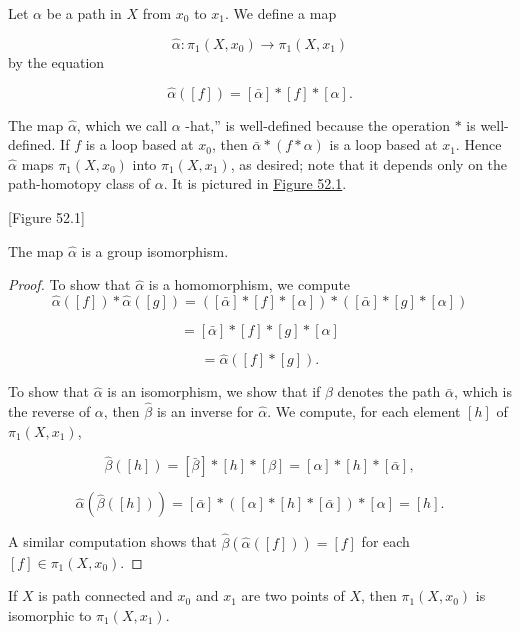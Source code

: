 \begin{definition}
Let \(\alpha\) be a path in \(X\) from \(x_{0}\) to \(x_{1}\). We define a map

\[
\hat{\alpha } : {\pi }_{1}( {X,x_{0}}) \rightarrow {\pi }_{1}( {X,x_{1}})
\]
by the equation

\[
\hat{\alpha }( [ f] ) = [ \bar{\alpha }] * [ f] * [ \alpha ] .
\]

The map \(\hat{\alpha }\), which we call \(\alpha\) -hat,'' is well-defined because the operation \(*\) is well-defined. If \(f\) is a loop based at \(x_{0}\), then \(\bar{\alpha } * ( {f * \alpha })\) is a loop based at \(x_{1}\). Hence \(\hat{\alpha }\) maps \({\pi }_{1}( {X,x_{0}})\) into \({\pi }_{1}( {X,x_{1}})\), as desired; note that it depends only on the path-homotopy class of \(\alpha\). It is pictured in \hyperref[fig:52.1]{Figure 52.1}.
\end{definition}

[Figure 52.1]
\begin{theorem}
\label{thm:\thetheorem}
The map \(\hat{\alpha }\) is a group isomorphism.
\end{theorem}

\begin{proof}
To show that \(\hat{\alpha }\) is a homomorphism, we compute
\[
\hat{\alpha }( [ f] ) * \hat{\alpha }( [ g] ) = ( {[ \bar{\alpha }] * [ f] * [ \alpha ] }) * ( {[ \bar{\alpha }] * [ g] * [ \alpha ] })
\]

\[
= [ \bar{\alpha }] * [ f] * [ g] * [ \alpha ]
\]

\[
= \hat{\alpha }( {[ f] * [ g] }) \text{.}
\]

To show that \(\hat{\alpha }\) is an isomorphism, we show that if \(\beta\) denotes the path \(\bar{\alpha }\), which is the reverse of \(\alpha\), then \(\hat{\beta }\) is an inverse for \(\hat{\alpha }\). We compute, for each element \([ h]\) of \({\pi }_{1}( {X,x_{1}})\),

\[
\hat{\beta }( [ h] ) = [ \bar{\beta }] * [ h] * [ \beta ] = [ \alpha ] * [ h] * [ \bar{\alpha }] ,
\]

\[
\hat{\alpha }( {\hat{\beta }( [ h] ) }) = [ \bar{\alpha }] * ( {[ \alpha ] * [ h] * [ \bar{\alpha }] }) * [ \alpha ] = [ h] .
\]

A similar computation shows that \(\hat{\beta }( {\hat{\alpha }( [ f] ) }) = [ f]\) for each \([ f] \in {\pi }_{1}( {X,x_{0}})\).
\end{proof}
\begin{corollary}
\label{cor:\thetheorem}
If \(X\) is path connected and \(x_{0}\) and \(x_{1}\) are two points of \(X\), then \({\pi }_{1}( {X,x_{0}})\) is isomorphic to \({\pi }_{1}( {X,x_{1}})\).
\end{corollary}

